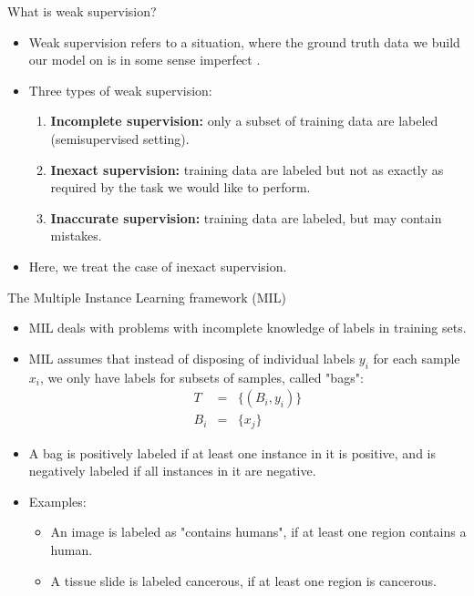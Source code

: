 \documentclass[xcolor=pdftex,dvipsnames,table]{beamer}
\begin{document}
\begin{frame}{What is weak supervision?}
\begin{itemize}
\item Weak supervision refers to a situation, where the ground truth data we build our model on is in some sense imperfect \cite{Zhou2018}. 
\item Three types of weak supervision:
\begin{enumerate}
\item \textbf{Incomplete supervision:} only a subset of training data are labeled (semisupervised setting).
\item \textbf{Inexact supervision:} training data are labeled but not as exactly as required by the task we would like to perform.
\item \textbf{Inaccurate supervision:} training data are labeled, but may contain mistakes. 
\end{enumerate}
\item Here, we treat the case of inexact supervision. 
\end{itemize}
\end{frame}

\begin{frame}{The Multiple Instance Learning framework (MIL)}
\begin{itemize}
\item MIL deals with problems with incomplete knowledge of labels in training sets.
\item MIL assumes that instead of disposing of individual labels $y_i$ for each sample $x_i$, we only have labels for subsets of samples, called "bags": 
\begin{eqnarray}
T &=& \{(B_i, y_i)\} \nonumber \\
B_i &=& \{x_j\}
\end{eqnarray}
\item A bag is positively labeled if at least one instance in it is positive, and is negatively labeled if all instances in it are negative.
\item Examples:
\begin{itemize}
   \item An image is labeled as "contains humans", if at least one region contains a human.
   \item A tissue slide is labeled cancerous, if at least one region is cancerous. 
\end{itemize}
\end{itemize}
\end{frame}
\end{document}
